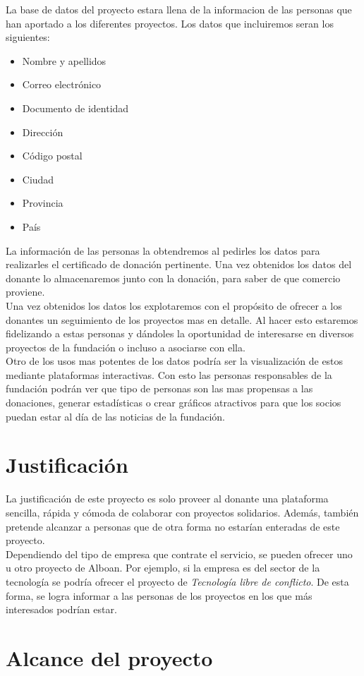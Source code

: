 \documentclass[paper=a4, fontsize=12pt]{scrartcl} %
\numberwithin{equation}{section} %
\numberwithin{figure}{section} %
\numberwithin{table}{section} %
\begin{document}
La base de datos del proyecto estara llena de la informacion de las personas que han aportado a los diferentes proyectos. Los datos que incluiremos seran los siguientes:
\begin{multicols}{2}
	\begin{itemize}
		\item Nombre y apellidos
		\item Correo electrónico
		\item Documento de identidad
		\item Dirección 
		\item Código postal
		\item Ciudad
		\item Provincia
		\item País
	\end{itemize}
\end{multicols}
La información de las personas la obtendremos al pedirles los datos para realizarles el certificado de donación pertinente. Una vez obtenidos los datos del donante lo almacenaremos junto con la donación, para saber de que comercio proviene.\\

Una vez obtenidos los datos los explotaremos con el propósito de ofrecer a los donantes un seguimiento de los proyectos mas en detalle. Al hacer esto estaremos fidelizando a estas personas y dándoles la oportunidad de interesarse en diversos proyectos de la fundación o incluso a asociarse con ella.\\

Otro de los usos mas potentes de los datos podría ser la visualización de estos mediante plataformas interactivas. Con esto las personas responsables de la fundación podrán ver que tipo de personas son las mas propensas a las donaciones, generar estadísticas o crear gráficos atractivos para que los socios puedan estar al día de las noticias de la fundación.

\section{Justificación}
La justificación de este proyecto es solo proveer al donante una plataforma sencilla, rápida y cómoda de colaborar con proyectos solidarios. Además, también pretende alcanzar a personas que de otra forma no estarían enteradas de este proyecto. \\
Dependiendo del tipo de empresa que contrate el servicio, se pueden ofrecer uno u otro proyecto de Alboan. Por ejemplo, si la empresa es del sector de la tecnología se podría ofrecer el proyecto de \textit{Tecnología libre de conflicto}. De esta forma, se logra informar a las personas de los proyectos en los que más interesados podrían estar.

\section{Alcance del proyecto}
\end{document}
